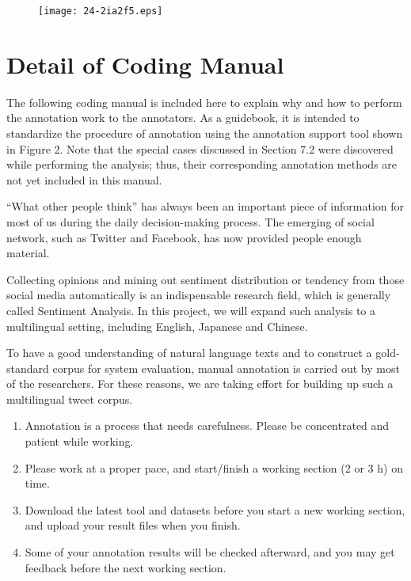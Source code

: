 \documentclass[english]{jnlp_1.4}
\begin{document}
\begin{figure}[H]
\vspace{-1.5\Cvs}
\begin{center}
\texttt{[image: 24-2ia2f5.eps]}
\end{center}
\label{annotation_result}
\end{figure}


\section{Detail of Coding Manual}

\noindent The following coding manual is included here to explain why and how to perform the annotation work to the annotators. As a guidebook, it is intended to standardize the procedure of annotation using the annotation support tool shown in Figure 2. Note that the special cases discussed in Section 7.2 were discovered while performing the analysis; thus, their corresponding annotation methods are not yet included in this manual.

\vspace{1\Cvs}

\noindent ``What other people think'' has always been an important piece of information for most of us during the daily decision-making process. The emerging of social network, such as Twitter and Facebook, has now provided people enough material.

\noindent Collecting opinions and mining out sentiment distribution or tendency from those social media automatically is an indispensable research field, which is generally called Sentiment Analysis. In this project, we will expand such analysis to a multilingual setting, including English, Japanese and Chinese.

\noindent To have a good understanding of natural language texts and to construct a gold-standard corpus for system evaluation, manual annotation is carried out by most of the researchers. For these reasons, we are taking effort for building up such a multilingual tweet corpus.

\vspace{1\Cvs}
\begin{enumerate}
	\item Annotation is a process that needs carefulness. Please be concentrated and patient while working. 
	\item Please work at a proper pace, and start/finish a working section (2 or 3 h) on time.
	\item Download the latest tool and datasets before you start a new working section, and upload your result files when you finish.
	\item Some of your annotation results will be checked afterward, and you may get feedback before the next working section.
\end{enumerate}
\end{document}
